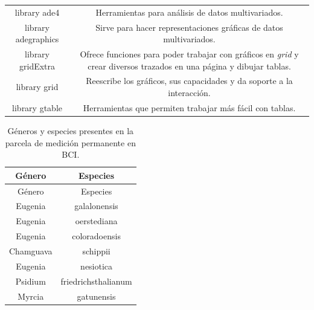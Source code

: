 \documentclass[11pt,]{article}
\begin{document}
\begin{longtable}[]{@{}cc@{}}
\begin{minipage}[t]{0.14\columnwidth}
library ade4\strut
\end{minipage} & \begin{minipage}[t]{0.80\columnwidth}\centering\strut
Herramientas para análisis de datos multivariados.\strut
\end{minipage}\tabularnewline
\begin{minipage}[t]{0.14\columnwidth}\centering\strut
library adegraphics\strut
\end{minipage} & \begin{minipage}[t]{0.80\columnwidth}\centering\strut
Sirve para hacer representaciones gráficas de datos multivariados.\strut
\end{minipage}\tabularnewline
\begin{minipage}[t]{0.14\columnwidth}\centering\strut
library gridExtra\strut
\end{minipage} & \begin{minipage}[t]{0.80\columnwidth}\centering\strut
Ofrece funciones para poder trabajar con gráficos en \emph{grid} y crear
diversos trazados en una página y dibujar tablas.\strut
\end{minipage}\tabularnewline
\begin{minipage}[t]{0.14\columnwidth}\centering\strut
library grid\strut
\end{minipage} & \begin{minipage}[t]{0.80\columnwidth}\centering\strut
Reescribe los gráficos, sus capacidades y da soporte a la
interacción.\strut
\end{minipage}\tabularnewline
\begin{minipage}[t]{0.14\columnwidth}\centering\strut
library gtable\strut
\end{minipage} & \begin{minipage}[t]{0.80\columnwidth}\centering\strut
Herramientas que permiten trabajar más fácil con tablas.\strut
\end{minipage}\tabularnewline
\bottomrule
\end{longtable}

\begin{longtable}[]{@{}cc@{}}
\caption{\label{tab:genero} Géneros y especies presentes en la parcela
de medición permanente en BCI.}\tabularnewline
\toprule
Género & Especies\tabularnewline
\midrule
\endfirsthead
\toprule
Género & Especies\tabularnewline
\midrule
\endhead
Eugenia & galalonensis\tabularnewline
Eugenia & oerstediana\tabularnewline
Eugenia & coloradoensis\tabularnewline
Chamguava & schippii\tabularnewline
Eugenia & nesiotica\tabularnewline
Psidium & friedrichsthalianum\tabularnewline
Myrcia & gatunensis\tabularnewline
\bottomrule
\end{longtable}
\end{document}
